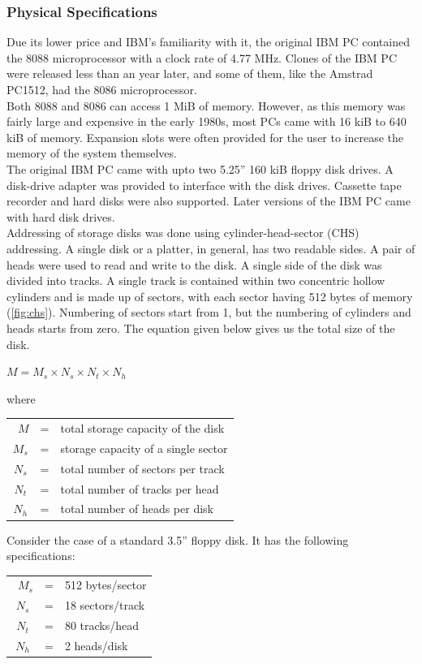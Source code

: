 \subsubsection{Physical Specifications}
Due its lower price and IBM's familiarity with it, the original IBM PC contained the 8088 microprocessor with a clock rate of 4.77 MHz. Clones of the IBM PC were released less than an year later, and some of them, like the Amstrad PC1512, had the 8086 microprocessor.\\
Both 8088 and 8086 can access 1 MiB of memory. However, as this memory was fairly large and expensive in the early 1980s, most PCs came with 16 kiB to 640 kiB of memory. Expansion slots were often provided for the user to increase the memory of the system themselves.\\
The original IBM PC came with upto two 5.25'' 160 kiB floppy disk drives. A disk-drive adapter was provided to interface with the disk drives. Cassette tape recorder and hard disks were also supported. Later versions of the IBM PC came with hard disk drives.\\
Addressing of storage disks was done using cylinder-head-sector (CHS) addressing. A single disk or a platter, in general, has two readable sides. A pair of heads were used to read and write to the disk. A single side of the disk was divided into tracks. A single track is contained within two concentric hollow cylinders and is made up of sectors, with each sector having 512 bytes of memory (\autoref{fig:chs}). Numbering of sectors start from 1, but the numbering of cylinders and heads starts from zero. The equation given below gives us the total size of the disk.
\begin{center}
$M = M_s \times N_s \times N_t \times N_h$
\end{center}
where
\begin{center}\begin{tabular}{ccl}\
$M$ &= &total storage capacity of the disk\\
$M_s$ &= &storage capacity of a single sector\\
$N_s$ &= &total number of sectors per track\\
$N_t$ &= &total number of tracks per head\\
$N_h$ &= &total number of heads per disk\\ 
\end{tabular}\end{center}
Consider the case of a standard 3.5'' floppy disk. It has the following specifications:
\begin{center}\begin{tabular}{ccl}\
$M_s$ &= &512 bytes/sector\\
$N_s$ &= &18 sectors/track\\
$N_t$ &= &80 tracks/head\\
$N_h$ &= &2 heads/disk\\ 
\end{tabular}\end{center}
